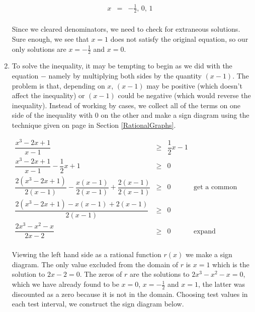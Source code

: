 \begin{ex}
\begin{enumerate}
\[\begin{array}{rclr}
x & = & -\frac{1}{2}, \, 0, \, 1 & \\


\end{array}\]

Since we cleared denominators, we need to check for extraneous solutions.  Sure enough, we see that $x=1$ does not satisfy the original equation, so  our only solutions are $x=-\frac{1}{2}$ and $x=0$.

\item  To solve the inequality, it may be tempting to begin as we did with the equation $-$ namely by multiplying both sides by the quantity $(x-1)$.  The problem is that, depending on $x$, $(x-1)$ may be positive (which doesn't affect the inequality) or $(x-1)$ could be negative (which would reverse the inequality).  Instead of working by cases, we collect all of the terms on one side of the inequality with $0$ on the other and make a sign diagram using the technique given on page \pageref{rationalsigndiagram} in Section \ref{RationalGraphs}.

\[ \begin{array}{rclr}

\dfrac{x^3-2x+1}{x-1} & \geq & \dfrac{1}{2}x-1 & \\ [10pt]

\dfrac{x^3-2x+1}{x-1}  - \dfrac{1}{2} x + 1& \geq & 0& \\ [10pt]

\dfrac{2 \left(x^3-2x+1\right)}{2(x-1)}  - \dfrac{x(x-1)}{2(x-1)} + \dfrac{2(x-1)}{2(x-1)}& \geq & 0&\text{get a common denominator} \\ [10pt]

\dfrac{2\left(x^3-2x+1\right)-x(x-1)+2(x-1)}{2(x-1)} & \geq & 0 & \\ [10pt]

\dfrac{2x^3-x^2-x}{2x-2} & \geq & 0 & \text{expand} \\

\end{array} \]

Viewing the left hand side as a rational function $r(x)$ we make a sign diagram.  The only value excluded from the domain of $r$ is $x=1$ which is the solution to $2x-2=0$.  The zeros of $r$ are the solutions to $2x^3-x^2-x=0$, which we have already found to be $x=0$, $x=-\frac{1}{2}$ and $x=1$, the latter was discounted as a zero because it is not in the domain.  Choosing test values in each test interval, we construct the sign diagram below. 

\begin{center}


\end{center}
\end{enumerate}
\end{ex}
